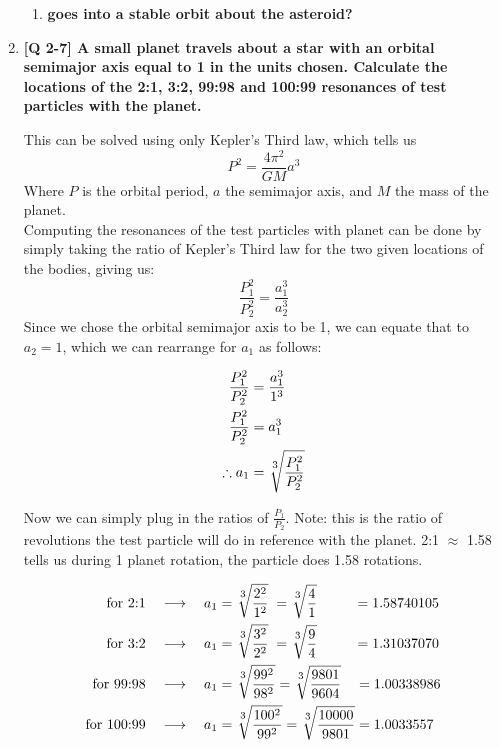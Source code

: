 \documentclass[11pt]{article}
\begin{document}
\begin{enumerate}
\begin{enumerate}
			\item  \textbf{goes into a stable orbit about the asteroid?}

		\end{enumerate}
		
		
		
		
		\newpage 
		\item  \textbf{ [Q 2-7] A small planet travels about a star with an orbital semimajor axis equal to 1 in the units chosen. Calculate the locations of the 2:1, 3:2, 99:98 and 100:99 resonances of test particles with the planet.}
		
		This can be solved using only Kepler's Third law, which tells us 
		\[P^2 = \frac{4\pi^2}{GM} a^3 \]
		Where $P$ is the orbital period, $a$ the semimajor axis, and $M$ the mass of the planet.\\ Computing the resonances of the test particles with planet can be done by simply taking the ratio of Kepler's Third law for the two given locations of the bodies, giving us:
		\[ \frac{P_1^2}{P_2^2} = \frac{a_1^3}{a_2^3} \]
		Since we chose the orbital semimajor axis to be 1, we can equate that to $a_2 = 1$, which we can rearrange for $a_1$ as follows:
		
		\begin{align*}
			\frac{P_1^2}{P_2^2} &= \frac{a_1^3}{1^3} \\
			\frac{P_1^2}{P_2^2} &= a_1^3 \\
			\therefore a_1 &= \sqrt[\uproot{3}\scriptstyle 3]{\frac{P_1^2}{P_2^2}}
		\end{align*}
		
		Now we can simply plug in the ratios of $\displaystyle \frac{P_1}{P_2}$. Note: this is the ratio of revolutions the test particle will do in reference with the planet. 2:1 $\approx$ 1.58 tells us during 1 planet rotation, the particle does 1.58 rotations.
		
		\begin{align*}
			\text{for 2:1} \quad \longrightarrow \quad a_1 &= \sqrt[\uproot{3}\scriptstyle 3]{\frac{2^2}{1^2}} \; = \sqrt[\uproot{3}\scriptstyle 3]{\frac{4}{1}} \hspace{26px} = 1.58740105 \\ 
			\text{for 3:2} \quad \longrightarrow \quad a_1 &= \sqrt[\uproot{3}\scriptstyle 3]{\frac{3^2}{2^2}} \; = \sqrt[\uproot{3}\scriptstyle 3]{\frac{9}{4}} \hspace{26px} = 1.31037070 \\ 
			\text{for 99:98} \quad \longrightarrow \quad a_1 &= \sqrt[\uproot{3}\scriptstyle 3]{\frac{99^2}{98^2}} = \sqrt[\uproot{3}\scriptstyle 3]{\frac{9801}{9604}} \hspace{10px} = 1.00338986 \\ 
			\text{for 100:99} \quad \longrightarrow \quad a_1 &= \sqrt[\uproot{3}\scriptstyle 3]{\frac{100^2}{99^2}} = \sqrt[\uproot{3}\scriptstyle 3]{\frac{10000}{9801}} = 1.0033557\\ 
		\end{align*}
		

\end{enumerate}
\end{document}
